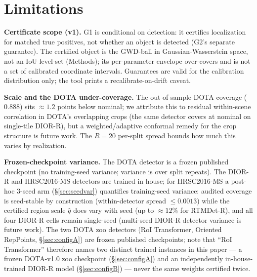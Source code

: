 \documentclass[11pt]{article}
\begin{document}
\section{Limitations}\label{sec:limitations}
\textbf{Certificate scope (v1).} G1 is conditional on detection: it certifies localization for matched
true positives, not whether an object is detected (G2's separate guarantee). The certified object is the
GWD-ball in Gaussian-Wasserstein space, not an IoU level-set (Methods); its per-parameter envelope
over-covers and is not a set of calibrated coordinate intervals. Guarantees are valid for the calibration
distribution only; the tool prints a recalibrate-on-drift caveat.

\textbf{Scale and the DOTA under-coverage.} The out-of-sample DOTA coverage ($0.888$) sits $\approx1.2$ points
below nominal; we attribute this to residual within-scene correlation in DOTA's overlapping crops (the same
detector covers at nominal on single-tile DIOR-R), but a weighted/adaptive conformal remedy for the crop
structure is future work. The $R{=}20$ per-split spread bounds how much this varies by realization.

\textbf{Frozen-checkpoint variance.} The DOTA detector is a frozen published checkpoint (no training-seed
variance; variance is over split repeats). The DIOR-R and HRSC2016-MS detectors are trained in house; for
HRSC2016-MS a post-hoc $3$-seed arm (\S\ref{sec:seedvar}) quantifies training-seed variance: audited coverage
is seed-stable by construction (within-detector spread $\le0.0013$) while the certified region scale $\hat q$
does vary with seed (up to $\approx12\%$ for RTMDet-R), and all four DIOR-R cells remain single-seed
(multi-seed DIOR-R detector variance is future work). The two DOTA zoo detectors (RoI Transformer, Oriented
RepPoints, \S\ref{sec:configA}) are frozen published checkpoints; note that ``RoI Transformer'' therefore
names two distinct trained instances in this paper --- a frozen DOTA-v1.0 zoo checkpoint (\S\ref{sec:configA})
and an independently in-house-trained DIOR-R model (\S\ref{sec:configB}) --- never the same weights certified
twice.
\end{document}
